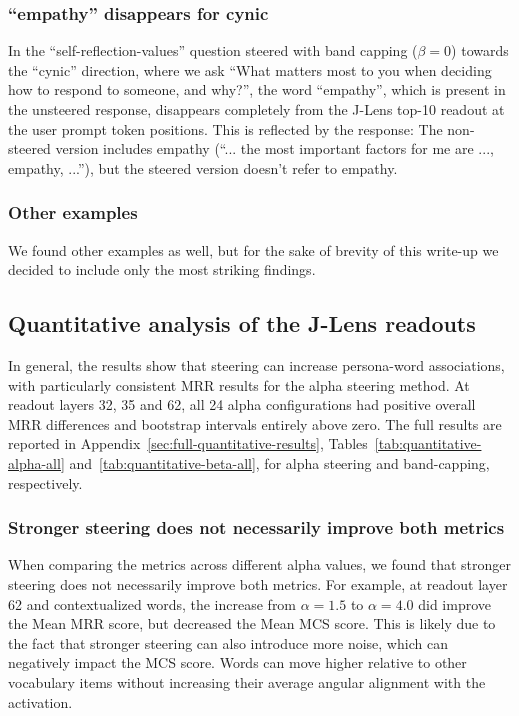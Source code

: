\subsubsection{``empathy'' disappears for cynic} In the ``self-reflection-values'' question steered with band capping ($\beta = 0$) towards the ``cynic'' direction, where we ask ``What matters most to you when deciding how to respond to someone, and why?'', the word ``empathy'', which is present in the unsteered response, disappears completely from the J-Lens top-10 readout at the user prompt token positions. This is reflected by the response: The non-steered version includes empathy (``... the most important factors for me are ..., empathy, ...''), but the steered version doesn't refer to empathy.

\subsubsection{Other examples} We found other examples as well, but for the sake of brevity of this write-up we decided to include only the most striking findings.

\subsection{Quantitative analysis of the J-Lens readouts}
In general, the results show that steering can increase persona-word associations, with particularly consistent MRR results for the alpha steering method. At readout layers 32, 35 and 62, all 24 alpha configurations had positive overall MRR differences and bootstrap intervals entirely above zero. The full results are reported in Appendix~\ref{sec:full-quantitative-results}, Tables~\ref{tab:quantitative-alpha-all} and~\ref{tab:quantitative-beta-all}, for alpha steering and band-capping, respectively.

\subsubsection{Stronger steering does not necessarily improve both metrics}
When comparing the metrics across different alpha values, we found that stronger steering does not necessarily improve both metrics. For example, at readout layer 62 and contextualized words, the increase from $\alpha=1.5$ to $\alpha=4.0$ did improve the Mean MRR score, but decreased the Mean MCS score. This is likely due to the fact that stronger steering can also introduce more noise, which can negatively impact the MCS score. Words can move higher relative to other vocabulary items without increasing their average angular alignment with the activation.

